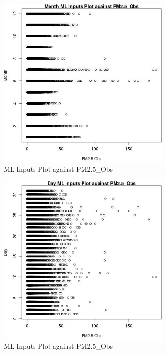 \begin{figure} 
\centering  
\includegraphics[width=0.77\textwidth]{Code_Outputs/Report_ML_input_PM25_Step4_part_e_de_duplicated_aves_MonthvPM25_Obs.jpg} 
\caption{\label{fig:Report_ML_input_PM25_Step4_part_e_de_duplicated_avesMonthvPM25_Obs}ML Inputs Plot against PM2.5_Obs} 
\end{figure} 
 

\clearpage 

\begin{figure} 
\centering  
\includegraphics[width=0.77\textwidth]{Code_Outputs/Report_ML_input_PM25_Step4_part_e_de_duplicated_aves_DayvPM25_Obs.jpg} 
\caption{\label{fig:Report_ML_input_PM25_Step4_part_e_de_duplicated_avesDayvPM25_Obs}ML Inputs Plot against PM2.5_Obs} 
\end{figure} 
 


